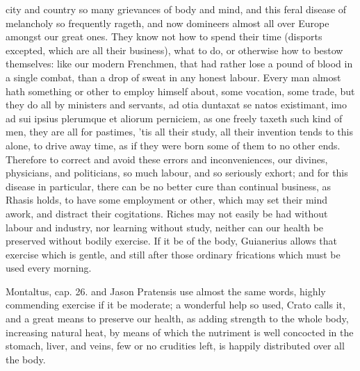 {city and country so many grievances of body and mind, and this feral
disease of melancholy so frequently rageth, and now domineers almost
all over Europe amongst our great ones. They know not how to spend
their time (disports excepted, which are all their business), what to
do, or otherwise how to bestow themselves: like our modern Frenchmen,
that had rather lose a pound of blood in a single combat, than a drop
of sweat in any honest labour. Every man almost hath something or other
to employ himself about, some vocation, some trade, but they do all by
ministers and servants, ad otia duntaxat se natos existimant, imo ad
sui ipsius plerumque et aliorum perniciem, as one freely taxeth
such kind of men, they are all for pastimes, 'tis all their study, all
their invention tends to this alone, to drive away time, as if they
were born some of them to no other ends. Therefore to correct and avoid
these errors and inconveniences, our divines, physicians, and
politicians, so much labour, and so seriously exhort; and for this
disease in particular, there can be no better cure than continual
business, as Rhasis holds, to have some employment or other, which may
set their mind awork, and distract their cogitations. Riches may not
easily be had without labour and industry, nor learning without study,
neither can our health be preserved without bodily exercise. If it be
of the body, Guianerius allows that exercise which is gentle, and
still after those ordinary frications which must be used every morning.

Montaltus, cap. 26. and Jason Pratensis use almost the same words,
highly commending exercise if it be moderate; a wonderful help so used,
Crato calls it, and a great means to preserve our health, as adding
strength to the whole body, increasing natural heat, by means of which
the nutriment is well concocted in the stomach, liver, and veins, few
or no crudities left, is happily distributed over all the body.

}
